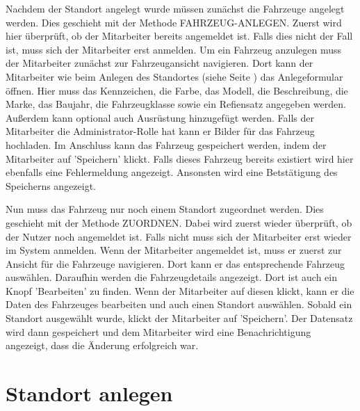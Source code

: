 

Nachdem der Standort angelegt wurde müssen zunächst die Fahrzeuge angelegt werden. Dies geschieht mit der Methode FAHRZEUG-ANLEGEN. Zuerst wird hier überprüft, ob der Mitarbeiter bereits angemeldet ist. Falls dies nicht der Fall ist, muss sich der Mitarbeiter erst anmelden. Um ein Fahrzeug anzulegen muss der Mitarbeiter zunächst zur Fahrzeugansicht navigieren. Dort kann der Mitarbeiter wie beim Anlegen des Standortes (siehe Seite \pageref{code:StandortAnlegen}) das Anlegeformular öffnen. Hier muss das Kennzeichen, die Farbe, das Modell, die Beschreibung, die Marke, das Baujahr, die Fahrzeugklasse sowie ein Refiensatz angegeben werden. Außerdem kann optional auch Ausrüstung hinzugefügt werden. Falls der Mitarbeiter die Administrator-Rolle hat kann er Bilder für das Fahrzeug hochladen. Im Anschluss kann das Fahrzeug gespeichert werden, indem der Mitarbeiter auf 'Speichern' klickt. Falls dieses Fahrzeug bereits existiert wird hier ebenfalls eine Fehlermeldung angezeigt. Ansonsten wird eine Betstätigung des Speicherns angezeigt.



Nun muss das Fahrzeug nur noch einem Standort zugeordnet werden. Dies geschieht mit der Methode ZUORDNEN. Dabei wird zuerst wieder überprüft, ob der Nutzer noch angemeldet ist. Falls nicht muss sich der Mitarbeiter erst wieder im System anmelden. Wenn der Mitarbeiter angemeldet ist, muss er zuerst zur Ansicht für die Fahrzeuge navigieren. Dort kann er das entsprechende Fahrzeug auswählen. Daraufhin werden die Fahrzeugdetails angezeigt. Dort ist auch ein Knopf 'Bearbeiten' zu finden. Wenn der Mitarbeiter auf diesen klickt, kann er die Daten des Fahrzeuges bearbeiten und auch einen Standort auswählen. Sobald ein Standort ausgewählt wurde, klickt der Mitarbeiter auf 'Speichern'. Der Datensatz wird dann gespeichert und dem Mitarbeiter wird eine Benachrichtigung angezeigt, dass die Änderung erfolgreich war.


\newpage

\section{Standort anlegen}

